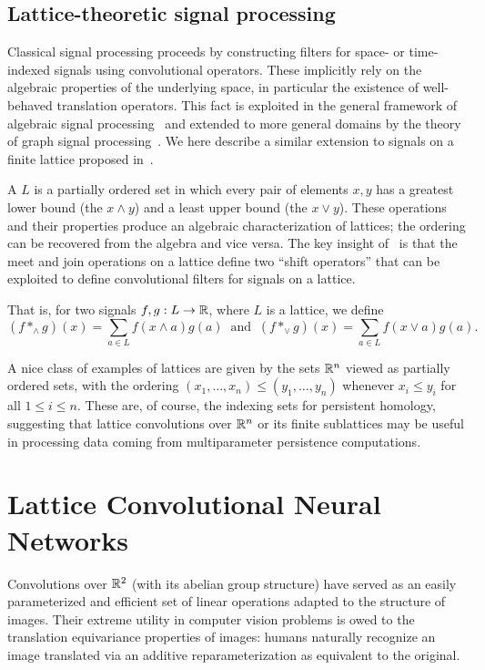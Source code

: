 \documentclass{article}
\begin{document}
\subsection{Lattice-theoretic signal processing}\label{sec:latticeconv}

Classical signal processing proceeds by constructing filters for space- or time-indexed signals using convolutional operators. These implicitly rely on the
algebraic properties of the underlying space, in particular the existence of
well-behaved translation operators. This fact is exploited in the general
framework of algebraic signal processing~\cite{puschel_algebraic_2008} and
extended to more general domains by the theory of graph signal
processing~\cite{ortega_graph_2018}. We here describe a similar extension to
signals on a finite lattice proposed in~\cite{pueschel_discrete_2019}.

A  $L$ is a partially ordered set in which every pair of
elements $x,y$ has a greatest lower bound (the  $x \wedge y$)
and a least upper bound (the  $x \vee y$). These operations
and their properties produce an algebraic characterization of lattices; the
ordering can be recovered from the algebra and vice versa. The key insight of~\cite{pueschel_discrete_2019} is that the meet and
join operations on a lattice define two ``shift operators'' that can be
exploited to define convolutional filters for signals on a lattice.

That is, for two signals $f,g: L \to \mathbb{R}$, where $L$ is a lattice, we define
\[(f *_\wedge g)(x) = \sum_{a \in L}f(x\wedge a)g(a) \;\;\text{and}\;\; (f *_\vee g)(x) = \sum_{a \in L}f(x\vee a)g(a).\]

A nice class of examples of lattices are given by the sets $\mathbb{R}^n$
viewed as partially ordered sets, with the ordering $(x_1,\ldots,x_n) \leq
(y_1,\ldots,y_n)$ whenever $x_i \leq y_i$ for all $1 \leq i \leq n$. These are,
of course, the indexing sets for persistent homology, suggesting that lattice
convolutions over $\mathbb{R}^n$ or its finite sublattices may be useful in processing
data coming from multiparameter persistence computations. 

\section{Lattice Convolutional Neural Networks}\label{sec:latticeCNN}

Convolutions over $\mathbb{R}^2$ (with its abelian group structure)
have served as an easily parameterized and efficient set of linear operations
adapted to the structure of images. Their extreme utility in computer vision
problems is owed to the translation equivariance properties of images: humans
naturally recognize an image translated via an additive reparameterization as
equivalent to the original.
\end{document}
